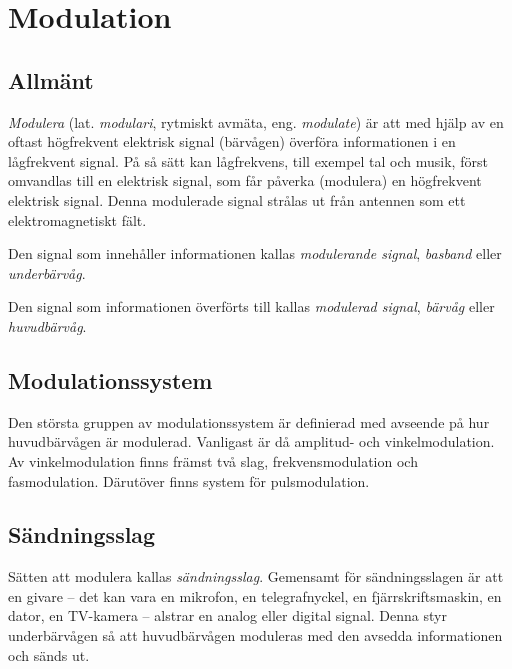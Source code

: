 \section{Modulation}
\label{modulation}

\subsection{Allmänt}

\emph{Modulera} (lat. \emph{modulari}, rytmiskt avmäta, eng. \emph{modulate})
är att med hjälp av en oftast högfrekvent elektrisk signal (bärvågen) överföra
informationen i en lågfrekvent signal.
På så sätt kan lågfrekvens, till exempel tal och musik, först omvandlas till en
elektrisk signal, som får påverka (modulera) en högfrekvent elektrisk signal.
Denna modulerade signal strålas ut från antennen som ett elektromagnetiskt fält.

Den signal som innehåller informationen kallas \emph{modulerande signal},
\emph{basband} eller \emph{underbärvåg}.

Den signal som informationen överförts till kallas \emph{modulerad signal},
\emph{bärvåg} eller \emph{huvudbärvåg}.

\subsection{Modulationssystem}
\label{modulationssystem}

Den största gruppen av modulationssystem är definierad med avseende på hur
huvudbärvågen är modulerad.
Vanligast är då amplitud- och vinkelmodulation.
Av vinkelmodulation finns främst två slag, frekvensmodulation och fasmodulation.
Därutöver finns system för pulsmodulation.

\subsection{Sändningsslag}
\label{sändningsslag}

Sätten att modulera kallas \emph{sändningsslag}.
Gemensamt för sändningsslagen är att en givare -- det kan vara en mikrofon, en
telegrafnyckel, en fjärrskriftsmaskin, en dator, en TV-kamera -- alstrar
en analog eller digital signal.
Denna styr underbärvågen så att huvudbärvågen moduleras med den avsedda
informationen och sänds ut.


